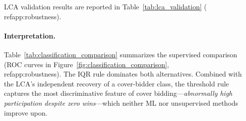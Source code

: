 LCA validation results are reported in Table~\ref{tab:lca_validation}
(\\ref{app:robustness}).

\paragraph{Interpretation.}
Table~\ref{tab:classification_comparison} summarizes the supervised
comparison (ROC curves in Figure~\ref{fig:classification_comparison},
\\ref{app:robustness}). The IQR rule dominates both alternatives. Combined with
the LCA's independent recovery of a cover-bidder class, the threshold
rule captures the most discriminative feature of cover
bidding---\emph{abnormally high participation despite zero wins}---which
neither ML nor unsupervised methods improve upon.


